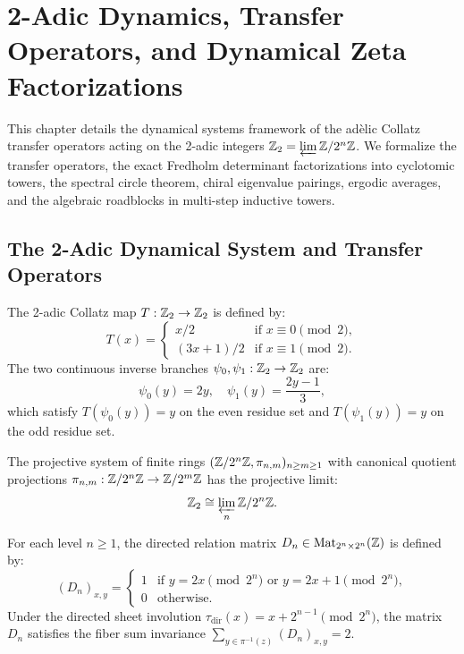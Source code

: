 \chapter{2-Adic Dynamics, Transfer Operators, and Dynamical Zeta Factorizations}
\label{chap:dynamics}

This chapter details the dynamical systems framework of the adèlic Collatz transfer operators acting on the 2-adic integers $\mathbb{Z}_2 = \varprojlim \mathbb{Z}/2^n\mathbb{Z}$. We formalize the transfer operators, the exact Fredholm determinant factorizations into cyclotomic towers, the spectral circle theorem, chiral eigenvalue pairings, ergodic averages, and the algebraic roadblocks in multi-step inductive towers.

\section{The 2-Adic Dynamical System and Transfer Operators}

\begin{definition}
\label{def:collatz_z2}
\leanok
The 2-adic Collatz map $T : \mathbb{Z}_2 \to \mathbb{Z}_2$ is defined by:
\[
T(x) = \begin{cases}
x / 2 & \text{if } x \equiv 0 \pmod 2, \\
(3x + 1) / 2 & \text{if } x \equiv 1 \pmod 2.
\end{cases}
\]
The two continuous inverse branches $\psi_0, \psi_1 : \mathbb{Z}_2 \to \mathbb{Z}_2$ are:
\[
\psi_0(y) = 2y, \quad \psi_1(y) = \frac{2y - 1}{3},
\]
which satisfy $T(\psi_0(y)) = y$ on the even residue set and $T(\psi_1(y)) = y$ on the odd residue set.
\end{definition}

\begin{definition}
\label{def:profinite_tower}
\leanok
The projective system of finite rings $(\mathbb{Z} / 2^n \mathbb{Z}, \pi_{n, m})_{n \ge m \ge 1}$ with canonical quotient projections $\pi_{n, m} : \mathbb{Z}/2^n\mathbb{Z} \to \mathbb{Z}/2^m\mathbb{Z}$ has the projective limit:
\[
\mathbb{Z}_2 \cong \varprojlim_{n} \mathbb{Z} / 2^n \mathbb{Z}.
\]
\end{definition}

\begin{definition}
\label{def:collatz_dir_matrix}
\leanok
For each level $n \ge 1$, the directed relation matrix $D_n \in \mathrm{Mat}_{2^n \times 2^n}(\mathbb{Z})$ is defined by:
\[
(D_n)_{x, y} = \begin{cases}
1 & \text{if } y = 2x \pmod{2^n} \text{ or } y = 2x + 1 \pmod{2^n}, \\
0 & \text{otherwise}.
\end{cases}
\]
Under the directed sheet involution $\tau_{\mathrm{dir}}(x) = x + 2^{n-1} \pmod{2^n}$, the matrix $D_n$ satisfies the fiber sum invariance $\sum_{y \in \pi^{-1}(z)} (D_n)_{x, y} = 2$.
\end{definition}


